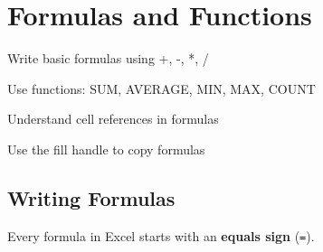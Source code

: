 \chapter{Formulas and Functions}
\label{ch:excel-formulas}

\begin{objectives}
  \item Write basic formulas using +, -, *, /
  \item Use functions: SUM, AVERAGE, MIN, MAX, COUNT
  \item Understand cell references in formulas
  \item Use the fill handle to copy formulas
\end{objectives}


\section{Writing Formulas}
\label{sec:formulas}

Every formula in Excel starts with an \textbf{equals sign} (\texttt{=}).

